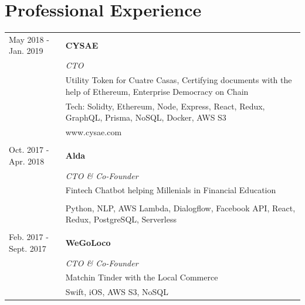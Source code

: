 \documentclass[11pt]{article}
\begin{document}
\section*{Professional Experience}
\begin{tabularx}{\textwidth}{lX}
  May 2018 - Jan. 2019   & \textbf{CYSAE} \\
                         & \textit{CTO} \\[1mm]
                         & Utility Token for Cuatre Casas, Certifying documents with the help of
                           Ethereum, Enterprise Democracy on Chain\\
                         & Tech: Solidty, Ethereum, Node, Express, React, Redux,
                           GraphQL, Prisma, NoSQL, Docker,  AWS S3 \\
                         & www.cysae.com  \\\\
  Oct. 2017 - Apr. 2018  & \textbf{Alda} \\
                         & \textit{CTO \& Co-Founder} \\[1mm]
                         & Fintech Chatbot helping Millenials in Financial Education\\\\
                         & Python, NLP, AWS Lambda, Dialogflow, Facebook API, React,
                           Redux, PostgreSQL, Serverless \\\\
  Feb. 2017 - Sept. 2017 & \textbf{WeGoLoco} \\
                         & \textit{CTO \& Co-Founder} \\[1mm]
                         & Matchin Tinder with the Local Commerce \\
                         & Swift, iOS, AWS S3, NoSQL 

  
  
  
  
  

\end{tabularx}
\end{document}
